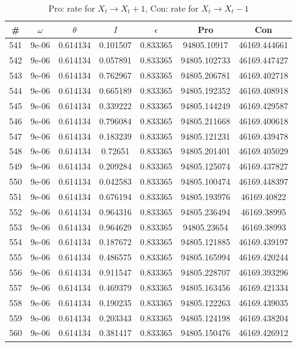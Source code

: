 \newpage
\begin{table}
\caption{Pro: rate for $X_t \rightarrow X_t + 1$, Con: rate for $X_t \rightarrow X_t - 1$}
\begin{tabular*}{\linewidth}{c|c|c|c|c|c|c}
\# & $\omega$ & $\theta$ & $I$ & $\epsilon$ & Pro & Con \\
\hline
541 & 9e-06 & 0.614134 & 0.101507 & 0.833365 & 94805.10917 & 46169.444661\\
542 & 9e-06 & 0.614134 & 0.057891 & 0.833365 & 94805.102733 & 46169.447427\\
543 & 9e-06 & 0.614134 & 0.762967 & 0.833365 & 94805.206781 & 46169.402718\\
544 & 9e-06 & 0.614134 & 0.665189 & 0.833365 & 94805.192352 & 46169.408918\\
545 & 9e-06 & 0.614134 & 0.339222 & 0.833365 & 94805.144249 & 46169.429587\\
546 & 9e-06 & 0.614134 & 0.796084 & 0.833365 & 94805.211668 & 46169.400618\\
547 & 9e-06 & 0.614134 & 0.183239 & 0.833365 & 94805.121231 & 46169.439478\\
548 & 9e-06 & 0.614134 & 0.72651 & 0.833365 & 94805.201401 & 46169.405029\\
549 & 9e-06 & 0.614134 & 0.209284 & 0.833365 & 94805.125074 & 46169.437827\\
550 & 9e-06 & 0.614134 & 0.042583 & 0.833365 & 94805.100474 & 46169.448397\\
551 & 9e-06 & 0.614134 & 0.676194 & 0.833365 & 94805.193976 & 46169.40822\\
552 & 9e-06 & 0.614134 & 0.964316 & 0.833365 & 94805.236494 & 46169.38995\\
553 & 9e-06 & 0.614134 & 0.964629 & 0.833365 & 94805.23654 & 46169.38993\\
554 & 9e-06 & 0.614134 & 0.187672 & 0.833365 & 94805.121885 & 46169.439197\\
555 & 9e-06 & 0.614134 & 0.486575 & 0.833365 & 94805.165994 & 46169.420244\\
556 & 9e-06 & 0.614134 & 0.911547 & 0.833365 & 94805.228707 & 46169.393296\\
557 & 9e-06 & 0.614134 & 0.469379 & 0.833365 & 94805.163456 & 46169.421334\\
558 & 9e-06 & 0.614134 & 0.190235 & 0.833365 & 94805.122263 & 46169.439035\\
559 & 9e-06 & 0.614134 & 0.203343 & 0.833365 & 94805.124198 & 46169.438204\\
560 & 9e-06 & 0.614134 & 0.381417 & 0.833365 & 94805.150476 & 46169.426912\\

\end{tabular*}
\end{table}
